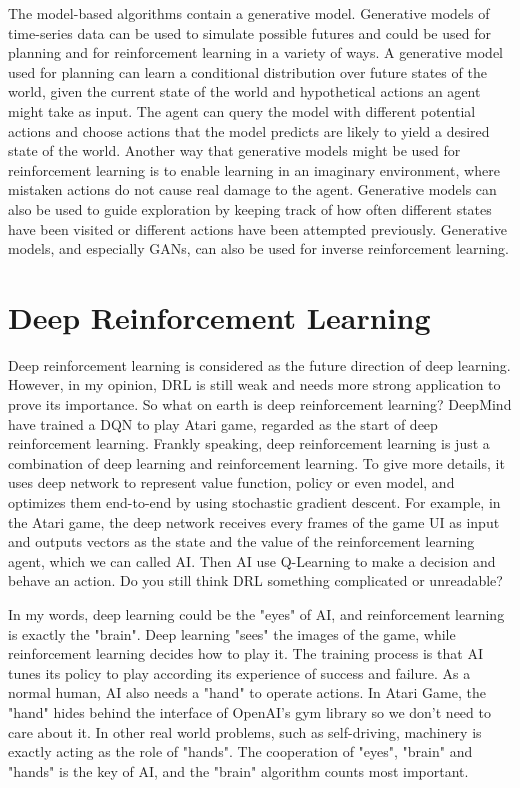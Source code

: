 \documentclass[10pt,twocolumn,letterpaper]{article}
\begin{document}
The model-based algorithms contain a generative model. Generative models of time-series data can be used to
simulate possible futures and could be used for planning and for reinforcement learning in a variety of ways. A 
generative model used for planning can learn a conditional distribution over future states of the world, given the current 
state of the world and hypothetical actions an agent might take as input. The agent can query the model with 
different potential actions and choose actions that the model predicts are likely to yield a desired state of the world. 
Another way that generative models might be used for reinforcement learning is to enable learning in an imaginary 
environment, where mistaken actions do not cause real damage to the agent. Generative models can also be used to 
guide exploration by keeping track of how often different states have been visited or different actions have been 
attempted previously. Generative models, and especially GANs, can also be used for inverse reinforcement learning. 

\section{Deep Reinforcement Learning}

Deep reinforcement learning is considered as the future direction of deep learning. However, in my opinion, DRL is still
weak and needs more strong application to prove its importance.  So what on earth is deep reinforcement learning? 
DeepMind have trained a DQN to play Atari game, regarded as the start of deep reinforcement learning. Frankly 
speaking, deep reinforcement learning is just a combination of deep learning and reinforcement learning. To give more
details, it uses deep network to represent value function, policy or even model, and optimizes them end-to-end by 
using stochastic gradient descent. For example, in the Atari game, the deep network receives every frames of the 
game UI as input and outputs vectors as the state and the value of the reinforcement learning agent, which we can called AI. Then AI
use Q-Learning to make a decision and behave an action. Do you still think DRL something complicated or unreadable?   

In my words, deep learning could be the "eyes" of AI, and reinforcement learning is exactly the "brain". Deep learning 
"sees" the images of the game, while reinforcement learning decides how to play it. The training process is that AI tunes
its policy to play according its experience of success and failure. As a normal human, AI also needs a "hand" to operate
actions. In Atari Game, the "hand" hides behind the interface of OpenAI's gym library so we don't need to care about it. In 
other real world problems, such as self-driving, machinery is exactly acting as the role of "hands". The cooperation of "eyes", "brain" and "hands" is the key of AI, and the "brain" algorithm counts most important.
\end{document}
